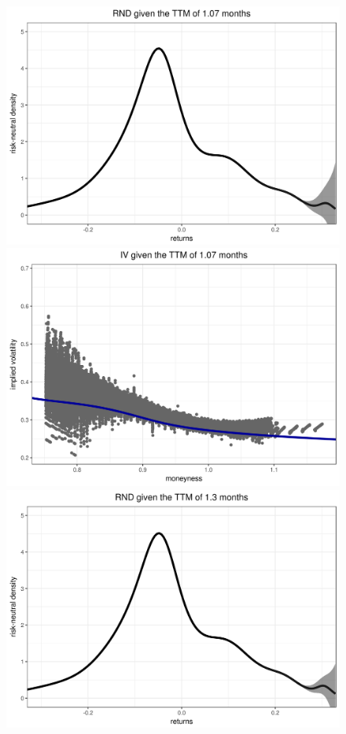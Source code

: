 \documentclass[a4paper,12pt]{article}
\theoremstyle{plain}
\theoremstyle{definition}
\begin{document}
\newpage

\begin{figure}[H]
\begin{center}
 \includegraphics[width=\linewidth]{figures/hour_1th/GOOG_20150105_rnd_ci_1th_hour_ttm_1_07.png}
 \endminipage
 \hspace{3mm}
 \includegraphics[width=\linewidth]{figures/hour_1th/GOOG_20150105_iv_smile_1th_hour_ttm_1_07.png}
 \endminipage\\
 \includegraphics[width=\linewidth]{figures/hour_1th/GOOG_20150105_rnd_ci_1th_hour_ttm_1_3.png}

\end{center}
\end{figure}
\end{document}
